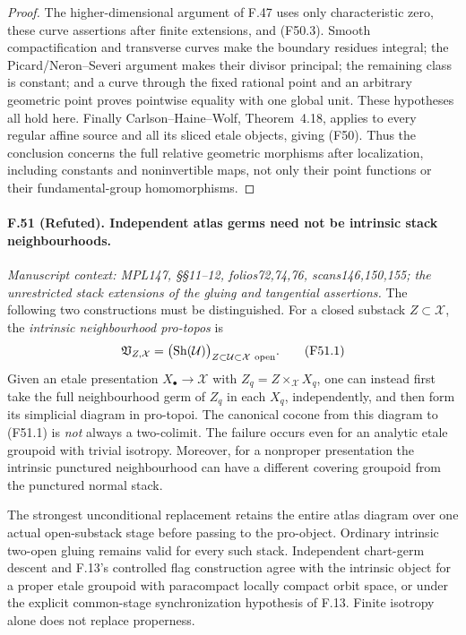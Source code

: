 \begin{proof}
The higher-dimensional argument of F.47 uses only characteristic
zero, these curve assertions after finite extensions, and
(F50.3). Smooth compactification and transverse curves make the
boundary residues integral; the Picard/Neron--Severi argument
makes their divisor principal; the remaining class is constant;
and a curve through the fixed rational point and an arbitrary
geometric point proves pointwise equality with one global unit.
These hypotheses all hold here. Finally Carlson--Haine--Wolf,
Theorem~4.18, applies to every regular affine source and all its
sliced etale objects, giving (F50). Thus the conclusion concerns
the full relative geometric morphisms after localization, including
constants and noninvertible maps, not only their point functions
or their fundamental-group homomorphisms.
\end{proof}

\paragraph{F.51 (Refuted). Independent atlas germs need not be intrinsic stack neighbourhoods.}
\textit{Manuscript context: MPL147, \S\S11--12, folios72,74,76,
scans146,150,155; the unrestricted stack extensions of the gluing and
tangential assertions.}
The following two constructions must be distinguished. For a closed
substack $Z\subset\mathcal X$, the \emph{intrinsic neighbourhood
pro-topos} is
\[
 \mathfrak V_{Z,\mathcal X}
   =\bigl(\operatorname{Sh}(\mathcal U)\bigr)_{
           Z\subset\mathcal U\subset\mathcal X\ {\rm open}}.
                                                        \tag{F51.1}
\]
Given an etale presentation $X_\bullet\to\mathcal X$ with
$Z_q=Z\times_{\mathcal X}X_q$, one can instead first take the full
neighbourhood germ of $Z_q$ in each $X_q$, independently, and then
form its simplicial diagram in pro-topoi. The canonical cocone from
this diagram to (F51.1) is \emph{not} always a two-colimit. The
failure occurs even for an analytic etale groupoid with trivial
isotropy. Moreover, for a nonproper presentation the intrinsic
punctured neighbourhood can have a different covering groupoid from
the punctured normal stack.

The strongest unconditional replacement retains the entire atlas
diagram over one actual open-substack stage before passing to the
pro-object. Ordinary intrinsic two-open gluing remains valid for
every such stack. Independent chart-germ descent and F.13's controlled
flag construction agree with the intrinsic object for a proper
etale groupoid with paracompact locally compact orbit space, or under
the explicit common-stage synchronization hypothesis of F.13.
Finite isotropy alone does not replace properness.

